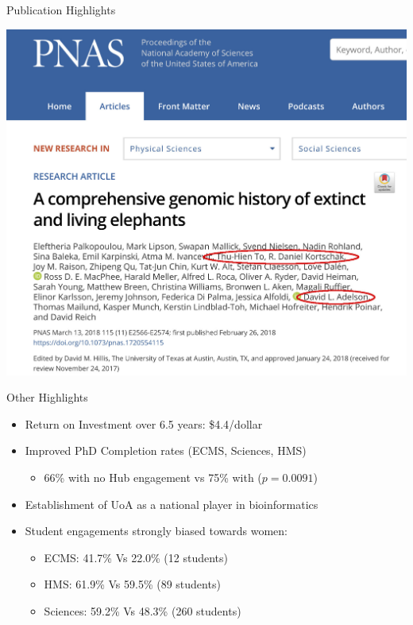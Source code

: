 \documentclass[11pt]{beamer}
\begin{document}
\begin{frame}{Publication Highlights}

\center
\includegraphics[width=0.7\linewidth]{figures/PNAS.jpg} \\[1cm]

\end{frame}


\begin{frame}{Other Highlights}

	\begin{itemize}
		\item Return on Investment over 6.5 years: \$4.4/dollar
		\item Improved PhD Completion rates (ECMS, Sciences, HMS)
		\begin{itemize}
			\item 66\% with no Hub engagement vs 75\% with ($p = 0.0091$)
		\end{itemize}	
		\item Establishment of UoA as a national player in bioinformatics
		\item Student engagements strongly biased towards women:
		\begin{itemize}
			\item ECMS: 41.7\% Vs 22.0\% (12 students)
			\item HMS: 61.9\% Vs 59.5\% (89 students)
			\item Sciences: 59.2\% Vs 48.3\% (260 students)\\[1cm]
		\end{itemize}
	\end{itemize}

\end{frame}
\end{document}
